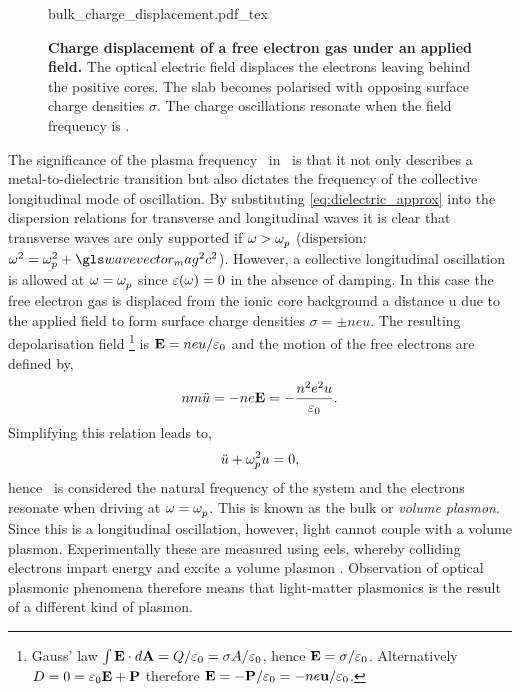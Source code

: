 \documentclass{article}
\begin{document}
\begin{figure}[bt]
\centering
\fontsize{10pt}{1em}\selectfont
{bulk_charge_displacement.pdf_tex}
\caption[Charge displacement of a free electron gas under an applied field]{\textbf{Charge displacement of a free electron gas under an applied field.} The optical electric field displaces the electrons leaving behind the positive cores. The slab becomes polarised with opposing surface charge densities $\sigma$. The charge oscillations resonate when the field frequency is \omegap.}
\label{fig:bulk_charge_displacement}
\end{figure}

The significance of the plasma frequency \omegap\ in \dielectric\ is that it not only describes a metal-to-dielectric transition but also dictates the frequency of the collective longitudinal mode of oscillation. By substituting \eqref{eq:dielectric_approx} into the dispersion relations for transverse and longitudinal waves it is clear that transverse waves are only supported if $\omega>\omegap$ (dispersion: $\omega^2=\omegap[2]+\wvm^2c^2$). However, a collective longitudinal oscillation is allowed at $\omega=\omegap$ since $\dielectric=0$ in the absence of damping. In this case the free electron gas is displaced from the ionic core background a distance \gls{u} due to the applied field to form surface charge densities $\sigma = \pm neu$. The resulting depolarisation field%
\footnote{Gauss' law $\int \vec{E}\cdot d\vec{A} = Q/\epsfs=\sigma A/\epsfs$, hence $\vec{E}=\sigma/\epsfs$. Alternatively $D=0=\epsfs\vec{E}+\vec{P}$ therefore $\vec{E}=-\vec{P}/\epsfs=-ne\vec{u}/\epsfs$.}
is $\vec{E} = neu/\epsfs$ and the motion of the free electrons are defined by,
\begin{equation}
nm\ddot{u} = -ne\vec{E} = -\frac{n^2e^2u}{\epsfs}.
\end{equation}
Simplifying this relation leads to,
\begin{equation}
\ddot{u}+\omegap[2] u=0,
\end{equation}
hence \omegap\ is considered the natural frequency of the system and the electrons resonate when driving at $\omega=\omegap$. This is known as the bulk or \emph{volume plasmon}. Since this is a longitudinal oscillation, however, light cannot couple with a volume plasmon. Experimentally these are measured using \gls{eels}, whereby colliding electrons impart energy and excite a volume plasmon \cite{}. Observation of optical plasmonic phenomena therefore means that light-matter plasmonics is the result of a different kind of plasmon.
\end{document}
